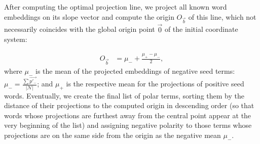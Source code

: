 After computing the optimal projection line, we project all known word
embeddings on its slope vector and compute the origin $O_{\vec{b}}$ of
this line, which not necessarily coincides with the global origin
point $\vec{0}$ of the initial coordinate system:

{\small%
  \begin{align}
    O_{\vec{b}} &= \mu_- + \frac{\mu_+ - \mu_-}{2},
\end{align}\normalsize}%
where $\mu_-$ is the mean of the projected embeddings of negative seed
terms: $\mu_- = \frac{\sum\vec{p'_-}}{|\mathcal{N}|}$; and $\mu_+$ is
the respective mean for the projections of positive seed words.
Eventually, we create the final list of polar terms, sorting them by
the distance of their projections to the computed origin in descending
order (so that words whose projections are furthest away from the
central point appear at the very beginning of the list) and assigning
negative polarity to those terms whose projections are on the same
side from the origin as the negative mean $\mu_-$.












